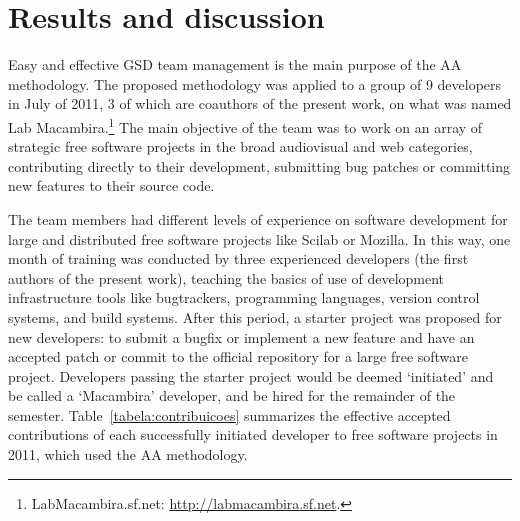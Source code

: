 \documentclass{article}
\begin{document}

\section{Results and discussion}
\label{results}

Easy and effective GSD team management is the main purpose of the AA
methodology. The proposed methodology was applied to a group of 9 developers in
July of 2011, 3 of which are coauthors of the present work, on what was named Lab
Macambira.\footnote{LabMacambira.sf.net: \url{http://labmacambira.sf.net}.} The
main objective of the team was to work on an array of strategic free software
projects in the broad audiovisual and web categories, contributing directly to
their development, submitting bug patches or committing new features to their
source code.

The team members had different levels of experience on software development for
large and distributed free software projects like Scilab or Mozilla. In this
way, one month of training was conducted by three experienced developers (the
first authors of the present work), teaching
the basics of use of development infrastructure tools like bugtrackers, programming
languages, version control systems, and build systems. After this period, a
starter project was proposed for new developers: to submit a bugfix or implement
a new feature and have an accepted
patch or commit to the official repository for a large free
software project.  Developers passing the starter project would be deemed
`initiated' and be called a `Macambira' developer, and be hired for the
remainder of the semester.
Table~\ref{tabela:contribuicoes} summarizes the effective accepted contributions
of each successfully initiated developer to free software projects in 2011,
which used the AA methodology.

\end{document}
